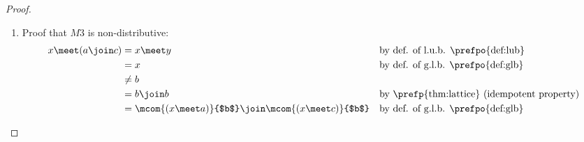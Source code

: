 \begin{proof}
\begin{enumerate}
  \item Proof that $M3$ is non-distributive:
    \begin{align*}
      x \meet ( a\join c)
        &= x \meet y
        && \text{by def. of l.u.b. \prefpo{def:lub}}
      \\&= x
        && \text{by def. of g.l.b. \prefpo{def:glb}}
      \\&\ne  b
      \\&= b \join b
        && \text{by \prefp{thm:lattice} (idempotent property)}
      \\&= \mcom{(x\meet a)}{$b$} \join \mcom{(x \meet c)}{$b$}
        && \text{by def. of g.l.b. \prefpo{def:glb}}
    \end{align*}


\end{enumerate}
\end{proof}
